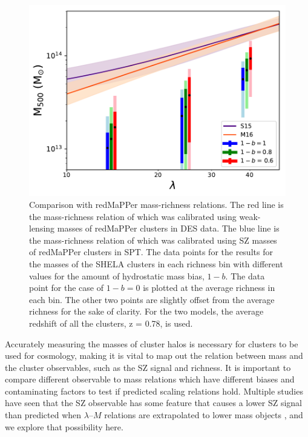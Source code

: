 \documentclass[a4paper,fleqn,usenatbib]{mnras}
\begin{document}
\begin{figure}
  \centering
    \includegraphics[width=\columnwidth] {M500_lambda_shela_sptvsrm.pdf}
  \caption{Comparison with redMaPPer mass-richness relations. The red line is the mass-richness relation of \protect \cite{2016arXiv161006890M} which was calibrated using weak-lensing masses of redMaPPer clusters in DES data. The blue line is the mass-richness relation of \protect \cite{2015MNRAS.454.2305S} which was calibrated using SZ masses of redMaPPer clusters in SPT. The data points for the results for the masses of the SHELA clusters in each richness bin with different values for the amount of hydrostatic mass bias, $1-b$. The data point for the case of $1-b=0$ is plotted at the average richness in each bin. The other two points are slightly offset from the average richness for the sake of clarity. For the two models, the average redshift of all the clusters, z = 0.78, is used.}
  \label{fig:y500vslambda}
\end{figure}


Accurately measuring the masses of cluster halos is necessary for clusters to be used for cosmology, making it is vital to map out the relation between mass and the cluster observables, such as the SZ signal and richness. It is important to compare different observable to mass relations which have different biases and contaminating factors to test if predicted scaling relations hold. Multiple studies have seen that the SZ observable has some feature that causes a lower SZ signal than predicted when $\lambda$--$M$ relations are extrapolated to lower mass objects \citep{2011A&A...536A..12P,2012PhRvD..85b3005D,2013ApJ...767...38S,2016arXiv160508770S}, and we explore that possibility here.  
\end{document}

